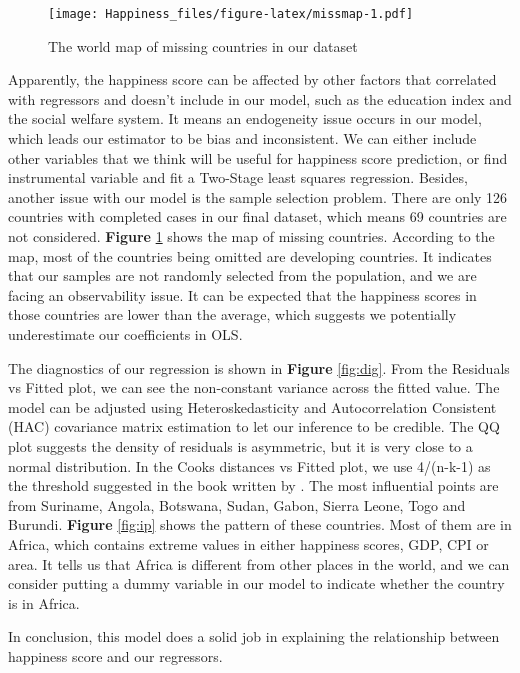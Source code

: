 \documentclass[11pt,a4paper,]{article}
\begin{document}
\begin{figure}
\centering
\texttt{[image: Happiness\_files/figure-latex/missmap-1.pdf]}
\caption{\label{fig:missmap}The world map of missing countries in our dataset}
\end{figure}

Apparently, the happiness score can be affected by other factors that correlated with regressors and doesn't include in our model, such as the education index and the social welfare system. It means an endogeneity issue occurs in our model, which leads our estimator to be bias and inconsistent. We can either include other variables that we think will be useful for happiness score prediction, or find instrumental variable and fit a Two-Stage least squares regression. Besides, another issue with our model is the sample selection problem. There are only 126 countries with completed cases in our final dataset, which means 69 countries are not considered. \textbf{Figure} \ref{fig:missmap} shows the map of missing countries. According to the map, most of the countries being omitted are developing countries. It indicates that our samples are not randomly selected from the population, and we are facing an observability issue. It can be expected that the happiness scores in those countries are lower than the average, which suggests we potentially underestimate our coefficients in OLS.

The diagnostics of our regression is shown in \textbf{Figure} \ref{fig:dig}. From the Residuals vs Fitted plot, we can see the non-constant variance across the fitted value. The model can be adjusted using Heteroskedasticity and Autocorrelation Consistent (HAC) covariance matrix estimation \autocite{newey1986simple} to let our inference to be credible. The QQ plot suggests the density of residuals is asymmetric, but it is very close to a normal distribution. In the Cooks distances vs Fitted plot, we use 4/(n-k-1) as the threshold suggested in the book written by \textcite{fox2019regression}. The most influential points are from Suriname, Angola, Botswana, Sudan, Gabon, Sierra Leone, Togo and Burundi. \textbf{Figure} \ref{fig:ip} shows the pattern of these countries. Most of them are in Africa, which contains extreme values in either happiness scores, GDP, CPI or area. It tells us that Africa is different from other places in the world, and we can consider putting a dummy variable in our model to indicate whether the country is in Africa.

In conclusion, this model does a solid job in explaining the relationship between happiness score and our regressors.
\end{document}
